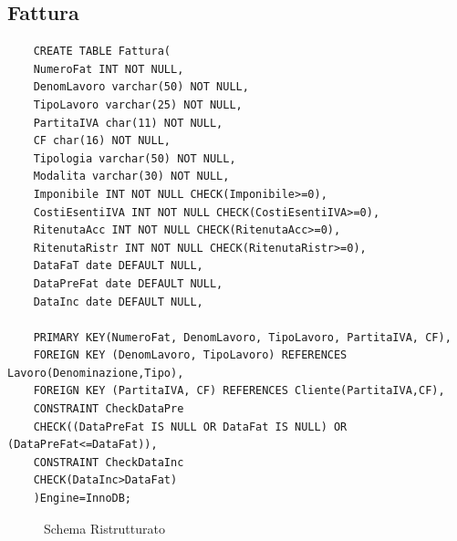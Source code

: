 \documentclass{elegantbook}
\begin{document}
\subsection{Fattura}
\begin{verbatim}
	CREATE TABLE Fattura(
	NumeroFat INT NOT NULL,
	DenomLavoro varchar(50) NOT NULL,
	TipoLavoro varchar(25) NOT NULL,
	PartitaIVA char(11) NOT NULL,
	CF char(16) NOT NULL,
	Tipologia varchar(50) NOT NULL,
	Modalita varchar(30) NOT NULL,
	Imponibile INT NOT NULL CHECK(Imponibile>=0),
	CostiEsentiIVA INT NOT NULL CHECK(CostiEsentiIVA>=0),
	RitenutaAcc INT NOT NULL CHECK(RitenutaAcc>=0),
	RitenutaRistr INT NOT NULL CHECK(RitenutaRistr>=0),
	DataFaT date DEFAULT NULL,
	DataPreFat date DEFAULT NULL,
	DataInc date DEFAULT NULL,
	
	PRIMARY KEY(NumeroFat, DenomLavoro, TipoLavoro, PartitaIVA, CF),
	FOREIGN KEY (DenomLavoro, TipoLavoro) REFERENCES Lavoro(Denominazione,Tipo),
	FOREIGN KEY (PartitaIVA, CF) REFERENCES Cliente(PartitaIVA,CF),
	CONSTRAINT CheckDataPre 
	CHECK((DataPreFat IS NULL OR DataFat IS NULL) OR (DataPreFat<=DataFat)),
	CONSTRAINT CheckDataInc 
	CHECK(DataInc>DataFat)
	)Engine=InnoDB;
\end{verbatim}
\begin{figure}[H]
	\centering
	\caption{Schema Ristrutturato}
\end{figure}
\end{document}
